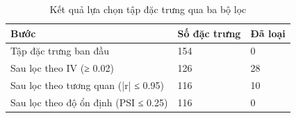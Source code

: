 \begin{table}[!htbp]
\centering
\caption{Kết quả lựa chọn tập đặc trưng qua ba bộ lọc}
\label{tab:selection}
\small
\setlength{\tabcolsep}{5.0pt}
\begin{tabular}{@{}L{7.4cm}R{3.2cm}R{3.2cm}@{}}
\toprule
\textbf{Bước} & \textbf{Số đặc trưng} & \textbf{Đã loại} \\
\midrule
Tập đặc trưng ban đầu & 154 & 0 \\
Sau lọc theo IV (≥ 0.02) & 126 & 28 \\
Sau lọc theo tương quan (|r| ≤ 0.95) & 116 & 10 \\
Sau lọc theo độ ổn định (PSI ≤ 0.25) & 116 & 0 \\
\bottomrule
\end{tabular}
\end{table}
